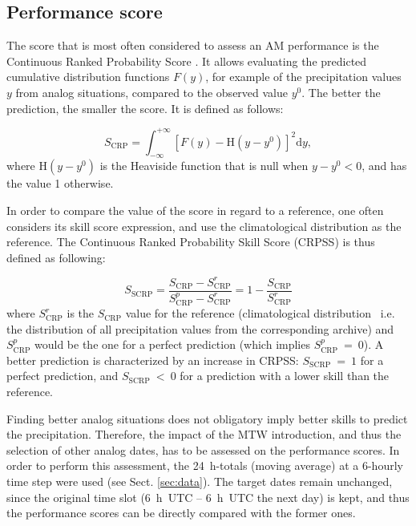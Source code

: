 \documentclass[hess, manuscript]{copernicus}
\begin{document}
\subsection{Performance score}
\label{sec:performance}

The score that is most often considered to assess an AM performance is the Continuous Ranked Probability Score \citep[CRPS,][]{Brown1974, Matheson1976, Hersbach2000}. It allows evaluating the predicted cumulative distribution functions $F(y)$, for example of the precipitation values $y$ from analog situations, compared to the observed value $y^{0}$. The better the prediction, the smaller the score. It is defined as follows:

\begin{equation}
\label{eq:CRPS}
S_{\text{CRP}} = \int_{-\infty}^{+\infty} \left[ F(y)-\text{H}(y-y^{0})\right]^{2} \text{d}y ,  
\end{equation}
where $\text{H}(y-y^{0})$ is the Heaviside function that is null when $y-y^{0}<0$, and has the value 1 otherwise.

In order to compare the value of the score in regard to a reference, one often considers its skill score expression, and use the climatological distribution as the reference. The Continuous Ranked Probability Skill Score (CRPSS) is thus defined as following:

\begin{equation}
\label{eq:CRPSS}
S_{\text{SCRP}} = \frac{S_{\text{CRP}}-S_{\text{CRP}}^{r}}{S_{\text{CRP}}^{p}-S_{\text{CRP}}^{r}} = 1-\frac{S_{\text{CRP}}}{S_{\text{CRP}}^{r}}
\end{equation}
where $S_{\text{CRP}}^{r}$ is the $S_{\text{CRP}}$ value for the reference (climatological distribution \textendash\ i.e. the distribution of all precipitation values from the corresponding archive) and $S_{\text{CRP}}^{p}$ would be the one for a perfect prediction (which implies $S_{\text{CRP}}^{p}~=~0$). A better prediction is characterized by an increase in CRPSS: $S_{\text{SCRP}}~=~1$ for a perfect prediction, and $S_{\text{SCRP}}~<~0$ for a prediction with a lower skill than the reference.



Finding better analog situations does not obligatory imply better skills to predict the precipitation. Therefore, the impact of the MTW introduction, and thus the selection of other analog dates, has to be assessed on the performance scores. In order to perform this assessment, the 24~h-totals (moving average) at a 6-hourly time step were used (see Sect. \ref{sec:data}). The target dates remain unchanged, since the original time slot (6~h~UTC -- 6~h~UTC the next day) is kept, and thus the performance scores can be directly compared with the former ones.
\end{document}
